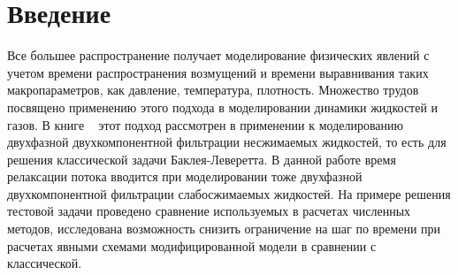 \section{Введение}
Все большее распространение получает моделирование физических явлений
с учетом времени распространения возмущений и времени выравнивания таких макропараметров,
как давление, температура, плотность.
Множество трудов посвящено применению этого подхода в моделировании динамики
жидкостей и газов. В книге ~\cite{Hasanov} этот подход рассмотрен в применении к моделированию
двухфазной двухкомпонентной фильтрации несжимаемых жидкостей, то есть для решения классической задачи Баклея-Леверетта.
В данной работе время релаксации потока вводится при моделировании тоже двухфазной двухкомпонентной
фильтрации слабосжимаемых жидкостей. На примере решения тестовой задачи проведено сравнение используемых в расчетах численных методов,
исследована возможность снизить ограничение на шаг по времени при расчетах явными схемами
модифицированной модели в сравнении с классической.
